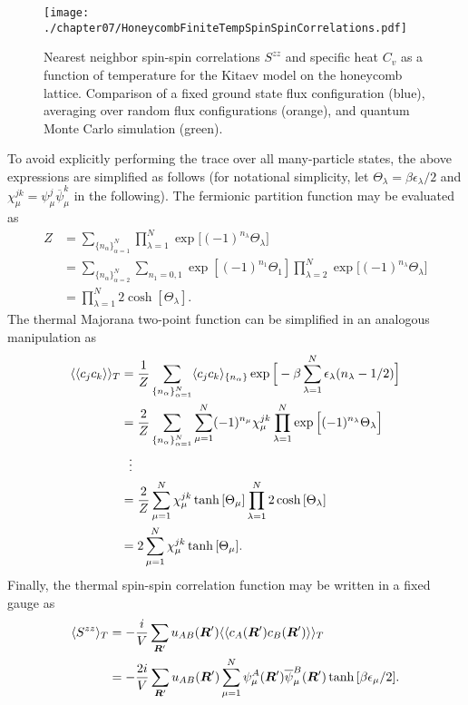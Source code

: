 %
\begin{figure}[tb]
	\centering
	\texttt{[image: ./chapter07/HoneycombFiniteTempSpinSpinCorrelations.pdf]}
	\caption{
		Nearest neighbor spin-spin correlations $S^{zz}$ and specific heat $C_v$ as a function of temperature for the Kitaev model on the honeycomb lattice.
		Comparison of a fixed ground state flux configuration (blue), averaging over random flux configurations (orange), and quantum Monte Carlo simulation (green).
	}
	\label{fig:chapter07_6_3SpinSpinCorrelations}
\end{figure}
%
To avoid explicitly performing the trace over all many-particle states, the above expressions are simplified as follows
(for notational simplicity, let $\Theta_\lambda = \beta \epsilon_\lambda/2$ and $\chi^{jk}_\mu = \psi^j_\mu \overline{\psi}^k_\mu$ in the following).
The fermionic partition function may be evaluated as
%
\begin{align}
	Z 	&= \sum_{\{n_\alpha\}_{\alpha=1}^N} \prod_{\lambda=1}^N \exp{\Big[(-1)^{n_\lambda} \Theta_\lambda\Big]} \nonumber\\
		&= \sum_{\{n_\alpha\}_{\alpha=2}^N} \sum_{n_1=0,1} \exp{[(-1)^{n_1} \Theta_1]} \prod_{\lambda=2}^N \exp{\Big[(-1)^{n_\lambda} \Theta_\lambda\Big]} \nonumber\\
		&= \prod_{\lambda=1}^N 2\cosh{[\Theta_\lambda]}.
\end{align}
%
The thermal Majorana two-point function can be simplified in an analogous manipulation as
%
\begin{align}
	\langle \langle c_j c_k \rangle \rangle_{T} &= \frac{1}{Z} \sum_{\{n_\alpha\}_{\alpha=1}^N} \langle c_j c_k \rangle_{\{n_\alpha\}} \exp{\Big[ -\beta \sum_{\lambda=1}^N \epsilon_\lambda (n_\lambda - 1/2) \Big]} \nonumber\\
							&= \frac{2}{Z} \sum_{\{n_\alpha\}_{\alpha=1}^N} \sum_{\mu=1}^N (-1)^{n_\mu} \chi^{jk}_\mu \prod_{\lambda=1}^N \exp{\Big[ (-1)^{n_\lambda} \Theta_\lambda \Big]} \nonumber\\
							&~~\vdots \nonumber\\
							&= \frac{2}{Z} \sum_{\mu=1}^N \chi^{jk}_\mu \tanh{[\Theta_\mu]} \prod_{\lambda=1}^N 2 \cosh{[\Theta_\lambda]} \nonumber\\
							&= 2 \sum_{\mu=1}^N \chi^{jk}_\mu \tanh{[\Theta_\mu]}.
\end{align}
Finally, the thermal spin-spin correlation function may be written in a fixed gauge as
\begin{align}
	\langle S^{z z} \rangle_T &= -\frac{i}{V} \sum_{\bm{R}'} u_{AB}(\bm{R}') \langle \langle c_A(\bm{R}') c_B(\bm{R}') \rangle \rangle_{T} \nonumber\\
					&= -\frac{2i}{V} \sum_{\bm{R}'} u_{AB}(\bm{R}') \sum_{\mu=1}^N \psi_\mu^A(\bm{R}') \overline{\psi}_\mu^B(\bm{R}') \tanh{[\beta \epsilon_\mu / 2]}.
	\label{eq:chapter07_ThermalSpinSpin}
\end{align}
%

